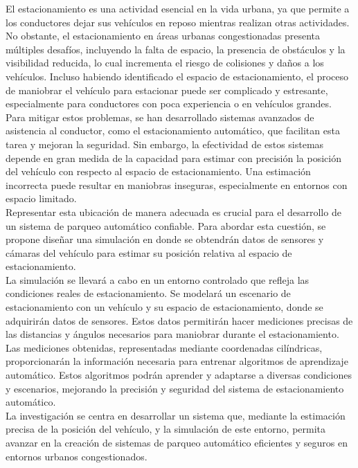 \noindent
El estacionamiento es una actividad esencial en la vida urbana, ya que permite a los conductores dejar sus vehículos en reposo mientras realizan otras actividades.
No obstante, el estacionamiento en áreas urbanas congestionadas presenta múltiples desafíos, incluyendo la falta de espacio,
la presencia de obstáculos y la visibilidad reducida, lo cual incrementa el riesgo de colisiones y daños a los vehículos.
Incluso habiendo identificado el espacio de estacionamiento, el proceso de maniobrar el vehículo para estacionar puede ser complicado y estresante,
especialmente para conductores con poca experiencia o en vehículos grandes.\\
\noindent
Para mitigar estos problemas, se han desarrollado sistemas avanzados de asistencia al conductor, como el estacionamiento automático,
que facilitan esta tarea y mejoran la seguridad.
Sin embargo, la efectividad de estos sistemas depende en gran medida de la capacidad para estimar con precisión la posición del vehículo
con respecto al espacio de estacionamiento.
Una estimación incorrecta puede resultar en maniobras inseguras, especialmente en entornos con espacio limitado.\\
\noindent
Representar esta ubicación de manera adecuada es crucial para el desarrollo de un sistema de parqueo automático confiable.
Para abordar esta cuestión, se propone diseñar una simulación en donde se obtendrán datos de sensores
y cámaras del vehículo para estimar su posición relativa al espacio de estacionamiento.\\
\noindent
La simulación se llevará a cabo en un entorno controlado que refleja las condiciones reales de estacionamiento.
Se modelará un escenario de estacionamiento con un vehículo y su espacio de estacionamiento, donde se adquirirán datos de sensores.
Estos datos permitirán hacer mediciones precisas de las distancias y ángulos necesarios para maniobrar durante el estacionamiento.\\
\noindent
Las mediciones obtenidas, representadas mediante coordenadas cilíndricas, proporcionarán la información necesaria para entrenar algoritmos de aprendizaje automático.
Estos algoritmos podrán aprender y adaptarse a diversas condiciones y escenarios, mejorando la precisión y seguridad del sistema de estacionamiento automático.\\
\noindent
La investigación se centra en desarrollar un sistema que, mediante la estimación precisa de la posición del vehículo,
y la simulación de este entorno, permita avanzar en la creación de sistemas de parqueo automático eficientes y seguros en entornos urbanos congestionados.